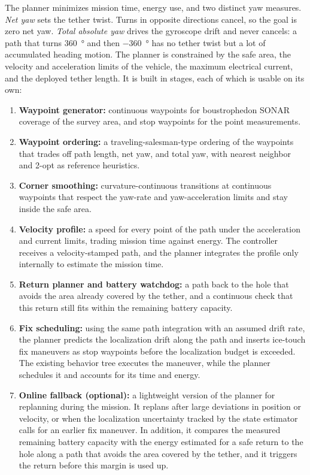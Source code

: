 \documentclass[article,notoc]{IDSCreport}
\begin{document}
The planner minimizes mission time, energy use, and two distinct yaw
measures. \emph{Net yaw} sets the tether twist. Turns in opposite directions
cancel, so the goal is zero net yaw. \emph{Total absolute yaw} drives the
gyroscope drift and never cancels: a path that turns \qty{+360}{\degree} and
then \qty{-360}{\degree} has no tether twist but a lot of accumulated heading motion. The
planner is constrained by the safe area, the velocity and acceleration limits
of the vehicle, the maximum electrical current, and the deployed tether length.
It is built in stages, each of which is usable on its own:
\begin{enumerate}
    \item \textbf{Waypoint generator:} continuous waypoints for boustrophedon
          SONAR coverage of the survey area, and stop waypoints for the point
          measurements.
    \item \textbf{Waypoint ordering:} a traveling-salesman-type ordering of the
          waypoints that trades off path length, net yaw, and total yaw, with
          nearest neighbor and 2-opt as reference heuristics.
    \item \textbf{Corner smoothing:} curvature-continuous transitions at
          continuous waypoints that respect the yaw-rate and yaw-acceleration
          limits and stay inside the safe area.
    \item \textbf{Velocity profile:} a speed for every point of the path under
          the acceleration and current limits, trading mission time against
          energy. The controller receives a velocity-stamped path, and the
          planner integrates the profile only internally to estimate the
          mission time.
    \item \textbf{Return planner and battery watchdog:} a path back to the hole
          that avoids the area already covered by the tether, and a continuous
          check that this return still fits within the remaining battery
          capacity.
    \item \textbf{Fix scheduling:} using the same path integration with an
          assumed drift rate, the planner predicts the localization drift along
          the path and inserts ice-touch fix maneuvers as stop waypoints before
          the localization budget is exceeded. The existing behavior tree
          executes the maneuver, while the planner schedules it and accounts for
          its time and energy.
    \item \textbf{Online fallback (optional):} a lightweight version of the
          planner for replanning during the mission. It replans after large
          deviations in position or velocity, or when the localization
          uncertainty tracked by the state estimator calls for an earlier fix
          maneuver. In addition, it compares the measured remaining battery
          capacity with the energy estimated for a safe return to the hole along
          a path that avoids the area covered by the tether, and it triggers the
          return before this margin is used up.
\end{enumerate}
\end{document}
